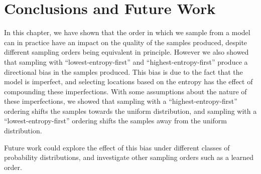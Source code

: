 \section{Conclusions and Future Work}
\label{s:a-o-conclusions}

In this chapter, we have shown that the order in which we sample from a model can in practice have an impact on the quality of the samples produced, despite different sampling orders being equivalent in principle. However we also showed that sampling with ``lowest-entropy-first'' and ``highest-entropy-first'' produce a directional bias in the samples produced. This bias is due to the fact that the model is imperfect, and selecting locations based on the entropy has the effect of compounding these imperfections. With some assumptions about the nature of these imperfections, we showed that sampling with a ``highest-entropy-first'' ordering shifts the samples towards the uniform distribution, and sampling with a ``lowest-entropy-first'' ordering shifts the samples away from the uniform distribution.

Future work could explore the effect of this bias under different classes of probability distributions, and investigate other sampling orders such as a learned order.
